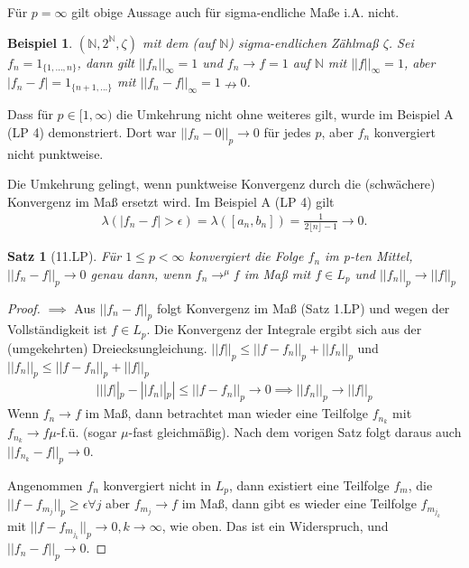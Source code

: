 \documentclass[]{article}
\newtheorem{theorem}{Satz}
\newtheorem*{example}{Beispiel}
\begin{document}
Für $p = \infty$ gilt obige Aussage auch für sigma-endliche Maße i.A. nicht.

\begin{example}
	$(\mathbb{N}, 2^\mathbb{N}, \zeta)$ mit dem (auf $\mathbb{N}$) sigma-endlichen Zählmaß $\zeta$. Sei $f_n = 1_{\{1,...,n\}}$, dann gilt $||f_n||_\infty = 1$ und $f_n \rightarrow f = 1$ auf $\mathbb{N}$ mit $||f||_\infty = 1$, aber $|f_n - f| = 1_{\{n+1,...\}}$ mit $||f_n - f||_\infty = 1 \nrightarrow 0$.
\end{example}

Dass für $p \in [1, \infty)$ die Umkehrung nicht ohne weiteres gilt, wurde im Beispiel A (LP 4) demonstriert. Dort war $||f_n - 0||_p \rightarrow 0$ für jedes $p$, aber $f_n$ konvergiert nicht punktweise.

Die Umkehrung gelingt, wenn punktweise Konvergenz durch die (schwächere) Konvergenz im Maß ersetzt wird. Im Beispiel A (LP 4) gilt
\begin{align*}
	\lambda(|f_n - f| > \epsilon) = \lambda([a_n, b_n]) = \frac{1}{2 \lfloor n \rfloor - 1} \rightarrow 0.
\end{align*}

\begin{theorem}[11.LP]
	Für $1 \leq p < \infty$ konvergiert die Folge $f_n$ im p-ten Mittel, $||f_n - f||_p \rightarrow 0$ genau dann, wenn $f_n \rightarrow^\mu f$ im Maß mit $f \in L_p$ und $||f_n||_p \rightarrow ||f||_p$
\end{theorem}

\begin{proof}
	$\implies$ Aus $||f_n-f||_p$ folgt Konvergenz im Maß (Satz 1.LP) und wegen der Vollständigkeit ist $f \in L_p$. Die Konvergenz der Integrale ergibt sich aus der (umgekehrten) Dreiecksungleichung. $||f||_p \leq ||f-f_n||_p + ||f_n||_p$ und $||f_n||_p \leq ||f-f_n||_p + ||f||_p$
	\begin{align*}
		| ||f||_p - ||f_n||_p | \leq ||f-f_n||_p \rightarrow 0 \implies ||f_n||_p \rightarrow ||f||_p
	\end{align*}
	Wenn $f_n\rightarrow f$ im Maß, dann betrachtet man wieder eine Teilfolge $f_{n_k}$ mit $f_{n_k}\rightarrow f \mu$-f.ü. (sogar $\mu$-fast gleichmäßig). Nach dem vorigen Satz folgt daraus auch $||f_{n_k}-f||_p \rightarrow 0$.
	
	Angenommen $f_n$ konvergiert nicht in $L_p$, dann existiert eine Teilfolge $f_m$, die $||f-f_{m_j}||_p \geq \epsilon \forall j$ aber $f_{m_j} \rightarrow f$ im Maß, dann gibt es wieder eine Teilfolge $f_{m_{j_k}}$ mit $||f-f_{m_{j_k}}||_p \rightarrow 0, k\rightarrow \infty$, wie oben. Das ist ein Widerspruch, und $||f_n-f||_p \rightarrow 0$.
\end{proof}
\end{document}
